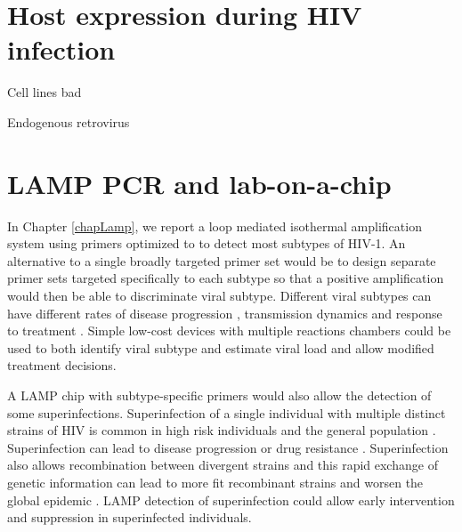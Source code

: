\documentclass[../sherrill-Mix_thesis.tex]{subfiles}
\begin{document}
\section{Host expression during HIV infection}

Cell lines bad

Endogenous retrovirus

\section{LAMP PCR and lab-on-a-chip}
		In Chapter \ref{chapLamp}, we report a loop mediated isothermal amplification system using primers optimized to to detect most subtypes of HIV-1. An alternative to a single broadly targeted primer set would be to design separate primer sets targeted specifically to each subtype so that a positive amplification would then be able to discriminate viral subtype. Different viral subtypes can have different rates of disease progression \citep{Kanki1999,Kaleebu2002,Baeten2007,Kiwanuka2008}, transmission dynamics \citep{Renjifo2004,John-Stewart2005,Huang2007b} and response to treatment \citep{Snoeck2006,Easterbrook2010,Scherrer2011}. Simple low-cost devices with multiple reactions chambers could be used to both identify viral subtype and estimate viral load \citep{Liu2014a,Mauk2015} and allow modified treatment decisions.
		
		A LAMP chip with subtype-specific primers would also allow the detection of some superinfections. Superinfection of a single individual with multiple distinct strains of HIV is common in high risk individuals \citep{Piantadosi2007,Powell2009,Ronen2013,Wagner2013,Redd2014} and the general population \citep{Redd2012a}. Superinfection can lead to disease progression \citep{Jost2002,Fang2004,Blick2007,Gottlieb2007,Streeck2008,Clerc2010} or drug resistance \citep{Smith2005}. Superinfection also allows recombination between divergent strains \citep{Fang2004,Pernas2006,Blick2007,Piantadosi2007,Streeck2008} and this rapid exchange of genetic information can lead to more fit recombinant strains and worsen the global epidemic \citep{Robertson1995,Gao1999,Hahn2000,Malim2001,Blick2007}. LAMP detection of superinfection could allow early intervention and suppression in superinfected individuals.
\end{document}
